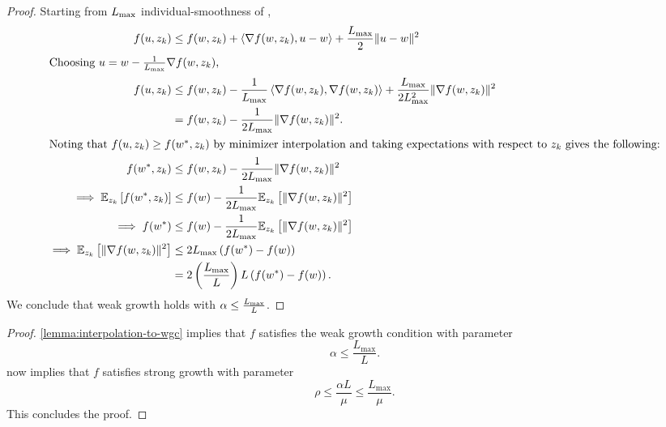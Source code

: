 \interpToWGC*
\begin{proof}
    Starting from \( L_{\text{max}} \) individual-smoothness of \oracle{}, 
    \begin{align*}
        f(u, z_{k}) &\leq f(w, z_{k}) + \left\langle\nabla f(w, z_{k}), u - w\right\rangle + \frac{L_{\text{max}}}{2}\|u - w\|^2\\
        \intertext{Choosing \( u = w- \frac{1}{L_{\text{max}}}\nabla f(w, z_{k}) \),}
        f(u, z_{k}) &\leq f(w, z_{k}) - \frac{1}{L_{\text{max}}}\left\langle\nabla f(w, z_{k}), \nabla f(w,z_{k})\right\rangle + \frac{L_{\text{max}}}{2L_{\text{max}}^2}\|\nabla f(w,z_{k})\|^2\\
        &= f(w, z_{k}) - \frac{1}{2L_{\text{max}}}\|\nabla f(w,z_{k})\|^2.\\
        \intertext{Noting that \( f(u,z_{k}) \geq f(w^*, z_{k}) \) by minimizer interpolation and taking expectations with respect to \( z_{k}\) gives the following:}
        f(w^*, z_{k}) &\leq f(w, z_{k}) - \frac{1}{2L_{\text{max}}}\|\nabla f(w,z_{k})\|^2\\
        \implies \mathbb{E}_{z_{k}}\left[f(w^*, z_{k})\right] &\leq f(w) - \frac{1}{2L_{\text{max}}}\mathbb{E}_{z_{k}}\left[\|\nabla f(w,z_{k})\|^2\right]\\
        \implies f(w^*) &\leq f(w) - \frac{1}{2L_{\text{max}}}\mathbb{E}_{z_{k}}\left[\|\nabla f(w,z_{k})\|^2\right]\\
        \implies \mathbb{E}_{z_{k}} \left[\|\nabla f(w,z_{k})\|^2\right] &\leq 2 L_{\text{max}} \left(f(w^*) - f(w)\right)\\
                                                  &= 2 \left(\frac{L_{\text{max}}}{L}\right) L \left(f(w^*) - f(w)\right).
    \end{align*}
    We conclude that weak growth holds with \( \alpha \leq \frac{L_{\text{max}}}{L} \). 
\end{proof}


\interpToSGC*
\begin{proof}
    \autoref{lemma:interpolation-to-wgc} implies that \( f \) satisfies the weak growth condition with parameter
    \[ \alpha \leq \frac{L_{\text{max}}}{L}. \]
    \citet[Proposition 1]{vaswani2019fast} now implies that \( f \) satisfies strong growth with parameter
    \[ \rho \leq \frac{\alpha L}{\mu} \leq \frac{L_{\text{max}}}{\mu}.  \]
    This concludes the proof.
\end{proof}
